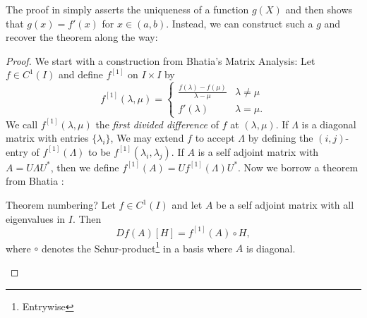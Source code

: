 The proof in \cite{pascoeTrace2020} simply asserts the uniqueness of a function
\(g(X)\) and then shows that \(g(x)=f'(x)\) for \(x \in (a,b)\). Instead, we can
construct such a \(g\) and recover the theorem along the way:
\begin{proof}

We start with a construction from Bhatia's Matrix Analysis: Let
$f \in C ^{1} (I)$ and define $f ^{[1]} $ on $I \times I$ by
\[
  f^{[1]} (\lambda,\mu) =
  \begin{cases}
    \frac{f(\lambda) - f(\mu)}{\lambda-\mu} & \lambda \neq \mu \\
    f'(\lambda) & \lambda = \mu.
  \end{cases}
\]
We call $f ^{[1]} (\lambda,\mu)$ the \emph{first divided difference} of $f$ at
$(\lambda,\mu)$. If $\Lambda$ is a diagonal matrix with entries
$\{ \lambda_{i}\} $, We may extend $f$ to accept $\Lambda$ by
defining the $(i,j)$-entry of $f ^{[1]} (\Lambda)$ to be
$f ^{[1]} (\lambda_i,\lambda_j)$. If $A$ is a self adjoint matrix with
$A = U \Lambda U ^{*} $, then we define
$f ^{[1]} (A) = U f ^{[1]} (\Lambda) U ^{*} $. Now we borrow a theorem from
Bhatia \cite{bhatiaMatrixAnalysis1997}:
\begin{theorem}[Bhatia V.3.3]
{\color{red} Theorem numbering?}
  Let $f \in C ^{1} (I)$ and let $A$ be a self adjoint matrix with all
  eigenvalues in $I$. Then \[
    Df(A)[H] = f ^{[1]} (A) \circ H,
  \]
  where $\circ$ denotes the Schur-product\footnote{Entrywise} in a basis where $A$ is diagonal.
\end{theorem}


\end{proof}
